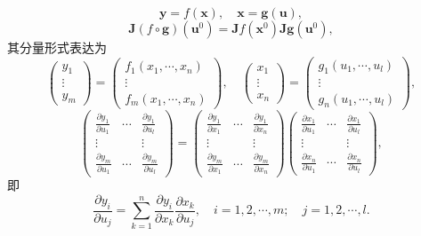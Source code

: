\begin{remark}\label{rem:8.2.3}
\[
  \boldsymbol{y} = f(\boldsymbol{x}), \quad \boldsymbol{x} = \boldsymbol{g}(\boldsymbol{u}),
\]
\[
  \boldsymbol{J}(f \circ \boldsymbol{g})(\boldsymbol{u}^{0}) = \boldsymbol{J}f(\boldsymbol{x}^{0})\boldsymbol{J}\boldsymbol{g}(\boldsymbol{u}^{0}),
\]
其分量形式表达为
\[
  \begin{pmatrix} y_{1} \\ \vdots \\ y_{m} \end{pmatrix} = \begin{pmatrix} f_{1}(x_{1}, \cdots, x_{n}) \\ \vdots \\ f_{m}(x_{1}, \cdots, x_{n}) \end{pmatrix}, \quad
  \begin{pmatrix} x_{1} \\ \vdots \\ x_{n} \end{pmatrix} = \begin{pmatrix} g_{1}(u_{1}, \cdots, u_{l}) \\ \vdots \\ g_{n}(u_{1}, \cdots, u_{l}) \end{pmatrix},
\]
\[
  \begin{pmatrix}
    \displaystyle\frac{\partial y_{1}}{\partial u_{1}} & \cdots & \displaystyle\frac{\partial y_{1}}{\partial u_{l}} \\[3mm]
    \vdots & & \vdots \\[2mm]
    \displaystyle\frac{\partial y_{m}}{\partial u_{1}} & \cdots & \displaystyle\frac{\partial y_{m}}{\partial u_{l}}
  \end{pmatrix} = \begin{pmatrix}
    \displaystyle\frac{\partial y_{1}}{\partial x_{1}} & \cdots & \displaystyle\frac{\partial y_{1}}{\partial x_{n}} \\[3mm]
    \vdots & & \vdots \\[2mm]
    \displaystyle\frac{\partial y_{m}}{\partial x_{1}} & \cdots & \displaystyle\frac{\partial y_{m}}{\partial x_{n}}
  \end{pmatrix}\begin{pmatrix}
    \displaystyle\frac{\partial x_{1}}{\partial u_{1}} & \cdots & \displaystyle\frac{\partial x_{1}}{\partial u_{l}} \\[3mm]
    \vdots & & \vdots \\[2mm]
    \displaystyle\frac{\partial x_{n}}{\partial u_{1}} & \cdots & \displaystyle\frac{\partial x_{n}}{\partial u_{l}}
  \end{pmatrix},
\]
即
\[
  \frac{\partial y_{i}}{\partial u_{j}} = \sum_{k=1}^{n}\frac{\partial y_{i}}{\partial x_{k}}\frac{\partial x_{k}}{\partial u_{j}}, \quad i = 1, 2, \cdots, m; \quad j = 1, 2, \cdots, l.
\]
\end{remark}


